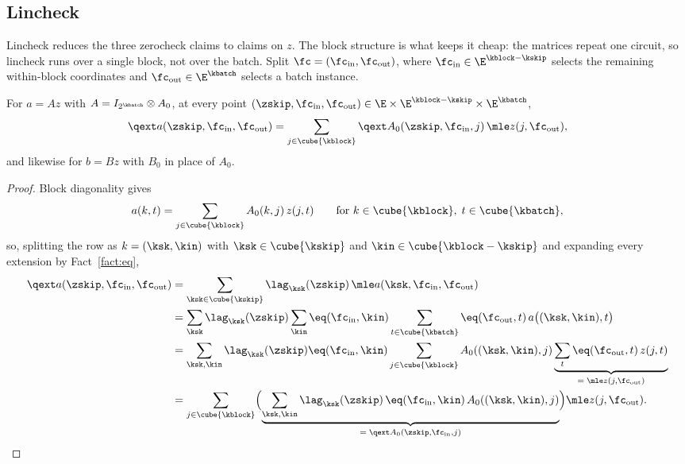 \subsection{Lincheck}\label{flock:lincheck}

Lincheck reduces the three zerocheck claims to claims on $z$. The block structure is what keeps it cheap: the matrices repeat one circuit, so lincheck runs over a single block, not over the batch. Split $\fc=(\fc_{\mathrm{in}},\fc_{\mathrm{out}})$, where $\fc_{\mathrm{in}}\in\E^{\kblock-\kskip}$ selects the remaining within-block coordinates and $\fc_{\mathrm{out}}\in\E^{\kbatch}$ selects a batch instance.

\begin{lemma}\label{lem:flock-block-diagonal}
For $a=Az$ with $A=I_{2^{\kbatch}}\otimes A_0$, at every point $(\zskip,\fc_{\mathrm{in}},\fc_{\mathrm{out}})\in\E\times\E^{\kblock-\kskip}\times\E^{\kbatch}$,
\[
\qext a(\zskip,\fc_{\mathrm{in}},\fc_{\mathrm{out}})=\sum_{j\in\cube{\kblock}}\qext A_0(\zskip,\fc_{\mathrm{in}},j)\,\mle z(j,\fc_{\mathrm{out}}),
\]
and likewise for $b=Bz$ with $B_0$ in place of $A_0$.
\end{lemma}

\begin{proof}
Block diagonality gives
\[
a(k,t)=\sum_{j\in\cube{\kblock}}A_0(k,j)\,z(j,t)\qquad\text{for }k\in\cube{\kblock},\;t\in\cube{\kbatch},
\]
so, splitting the row as $k=(\ksk,\kin)$ with $\ksk\in\cube{\kskip}$ and $\kin\in\cube{\kblock-\kskip}$ and expanding every extension by Fact~\ref{fact:eq},
\begin{align*}
\qext a(\zskip,\fc_{\mathrm{in}},\fc_{\mathrm{out}})&=\sum_{\ksk\in\cube{\kskip}}\lag_{\ksk}(\zskip)\,\mle a(\ksk,\fc_{\mathrm{in}},\fc_{\mathrm{out}})\\
&=\sum_{\ksk}\lag_{\ksk}(\zskip)\sum_{\kin}\eq(\fc_{\mathrm{in}},\kin)\sum_{t\in\cube{\kbatch}}\eq(\fc_{\mathrm{out}},t)\,a\bigl((\ksk,\kin),t\bigr)\\
&=\sum_{\ksk,\kin}\lag_{\ksk}(\zskip)\eq(\fc_{\mathrm{in}},\kin)\sum_{j\in\cube{\kblock}}A_0((\ksk,\kin),j)\underbrace{\sum_{t}\eq(\fc_{\mathrm{out}},t)\,z(j,t)}_{=\;\mle z(j,\fc_{\mathrm{out}})}\\
&=\sum_{j\in\cube{\kblock}}\Bigl(\underbrace{\sum_{\ksk,\kin}\lag_{\ksk}(\zskip)\,\eq(\fc_{\mathrm{in}},\kin)\,A_0((\ksk,\kin),j)}_{=\;\qext A_0(\zskip,\fc_{\mathrm{in}},j)}\Bigr)\mle z(j,\fc_{\mathrm{out}}).
\end{align*}
\end{proof}

